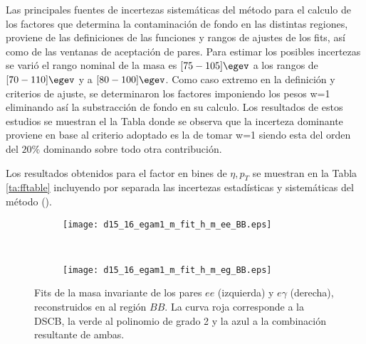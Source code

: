Las principales fuentes de incertezas sistemáticas del método para el calculo de los factores que determina la contaminación de fondo en las distintas regiones, proviene de las definiciones de las funciones y rangos de ajustes de los fits, así como de las ventanas de aceptación de pares.  Para estimar los posibles incertezas se varió el rango nominal de la masa es $[75-105]\egev$ a los rangos de $[70-110]\egev$ y a $[80-100]\egev$. Como caso extremo en la definición y criterios de ajuste, se determinaron los factores imponiendo los pesos w=1 eliminando así la substracción de fondo en su calculo. Los resultados de estos estudios se muestran el la Tabla \label{ta:fftable} donde se observa que la incerteza dominante proviene en base al criterio adoptado es la de tomar w=1 siendo esta del orden del $20 \%$ dominando sobre todo otra contribución.



Los resultados obtenidos para el factor en bines de $\eta , p_{T}$ se muestran en la Tabla \ref{ta:fftable} incluyendo por separada las incertezas estadísticas y sistemáticas del método ().




\begin{figure}

	\begin{subfigure}{0.5\textwidth}
		\texttt{[image: d15\_16\_egam1\_m\_fit\_h\_m\_ee\_BB.eps]} 
	\end{subfigure}
	~
	\begin{subfigure}{0.5\textwidth}
		\texttt{[image: d15\_16\_egam1\_m\_fit\_h\_m\_eg\_BB.eps]}
	\end{subfigure}

	
	\caption{Fits de la masa invariante de los pares $ee$ (izquierda) y $e\gamma$ (derecha), reconstruidos en al región $BB$. La curva roja corresponde a la DSCB, la verde al polinomio de grado 2 y la azul a la combinación resultante de ambas.}
\label{fits_BB}
\end{figure}

